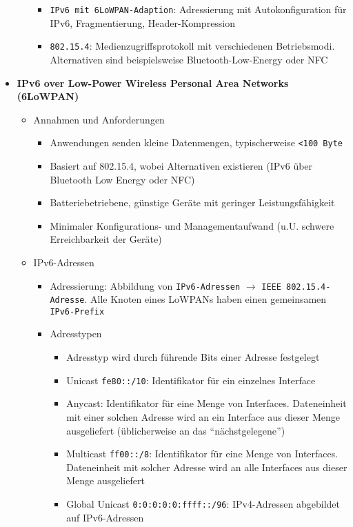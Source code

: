 \begin{itemize}
\begin{itemize}
\begin{itemize}
			\item \texttt{IPv6 mit 6LoWPAN-Adaption}: Adressierung mit Autokonfiguration für IPv6, Fragmentierung, Header-Kompression
			\item \texttt{802.15.4}: Medienzugriffsprotokoll mit verschiedenen Betriebsmodi. Alternativen sind beispielsweise Bluetooth-Low-Energy oder NFC
		\end{itemize}
	\end{itemize}
	\item \textbf{IPv6 over Low-Power Wireless Personal Area Networks (6LoWPAN)}
	\begin{itemize}
		\item Annahmen und Anforderungen
		\begin{itemize}
			\item Anwendungen senden kleine Datenmengen, typischerweise \texttt{<100 Byte}
			\item Basiert auf 802.15.4, wobei Alternativen existieren (IPv6 über Bluetooth Low Energy oder NFC)
			\item Batteriebetriebene, günstige Geräte mit geringer Leistungsfähigkeit
			\item Minimaler Konfigurations- und Managementaufwand (u.U. schwere Erreichbarkeit der Geräte)
		\end{itemize}
		\item IPv6-Adressen
		\begin{itemize}
			\item Adressierung: Abbildung von \texttt{IPv6-Adressen} \(\rightarrow\) \texttt{IEEE 802.15.4-Adresse}. Alle Knoten eines LoWPANs haben einen gemeinsamen \texttt{IPv6-Prefix}
			\item Adresstypen
			\begin{itemize}
				\item Adresstyp wird durch führende Bits einer Adresse festgelegt
				\item Unicast \texttt{fe80::/10}: Identifikator für ein einzelnes Interface
				\item Anycast: Identifikator für eine Menge von Interfaces. Dateneinheit mit einer solchen Adresse wird an ein Interface aus dieser Menge ausgeliefert (üblicherweise an das "`nächstgelegene"')
				\item Multicast \texttt{ff00::/8}: Identifikator für eine Menge von Interfaces. Dateneinheit mit solcher Adresse wird an alle Interfaces aus dieser Menge ausgeliefert
				\item Global Unicast \texttt{0:0:0:0:0:ffff::/96}: IPv4-Adressen abgebildet auf IPv6-Adressen

\end{itemize}
\end{itemize}
\end{itemize}
\end{itemize}
